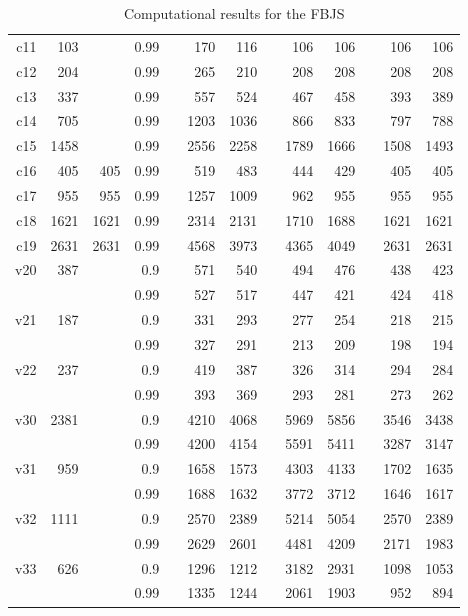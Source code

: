 \documentclass[a4paper,11pt]{article}
\begin{document}
\begin{table}
\begin{tabular}{@{\bfseries}rrrrrrrrrrrrr}
	c11  &  103 &      &  0.99 &&  170 &  116 &&  106 &  106 &&  106 &  106 \\
	c12  &  204 &      &  0.99 &&  265 &  210 &&  208 &  208 &&  208 &  208 \\
	c13  &  337 &      &  0.99 &&  557 &  524 &&  467 &  458 &&  393 &  389 \\
	c14  &  705 &      &  0.99 && 1203 & 1036 &&  866 &  833 &&  797 &  788 \\
	c15  & 1458 &      &  0.99 && 2556 & 2258 && 1789 & 1666 && 1508 & 1493 \\
	c16  &  405 &  405 &  0.99 &&  519 &  483 &&  444 &  429 &&  405 &  405 \\
	c17  &  955 &  955 &  0.99 && 1257 & 1009 &&  962 &  955 &&  955 &  955 \\
	c18  & 1621 & 1621 &  0.99 && 2314 & 2131 && 1710 & 1688 && 1621 & 1621 \\
	c19  & 2631 & 2631 &  0.99 && 4568 & 3973 && 4365 & 4049 && 2631 & 2631 \\[2ex]
	v20  &  387 &      &   0.9 &&  571 &  540 &&  494 &  476 &&  438 &  423 \\
	     &      &      &  0.99 &&  527 &  517 &&  447 &  421 &&  424 &  418 \\
	v21  &  187 &      &   0.9 &&  331 &  293 &&  277 &  254 &&  218 &  215 \\
	     &      &      &  0.99 &&  327 &  291 &&  213 &  209 &&  198 &  194 \\
	v22  &  237 &      &   0.9 &&  419 &  387 &&  326 &  314 &&  294 &  284 \\
	     &      &      &  0.99 &&  393 &  369 &&  293 &  281 &&  273 &  262 \\
	v30  & 2381 &      &   0.9 && 4210 & 4068 && 5969 & 5856 && 3546 & 3438 \\
	     &      &      &  0.99 && 4200 & 4154 && 5591 & 5411 && 3287 & 3147 \\
	v31  &  959 &      &   0.9 && 1658 & 1573 && 4303 & 4133 && 1702 & 1635 \\
	     &      &      &  0.99 && 1688 & 1632 && 3772 & 3712 && 1646 & 1617 \\
	v32  & 1111 &      &   0.9 && 2570 & 2389 && 5214 & 5054 && 2570 & 2389 \\
	     &      &      &  0.99 && 2629 & 2601 && 4481 & 4209 && 2171 & 1983 \\
	v33  &  626 &      &   0.9 && 1296 & 1212 && 3182 & 2931 && 1098 & 1053 \\
	     &      &      &  0.99 && 1335 & 1244 && 2061 & 1903 &&  952 &  894 \\
	\bottomrule
\end{tabular}
\caption{Computational results for the FBJS}
\label{table:fbjs}
\end{table}
\end{document}
